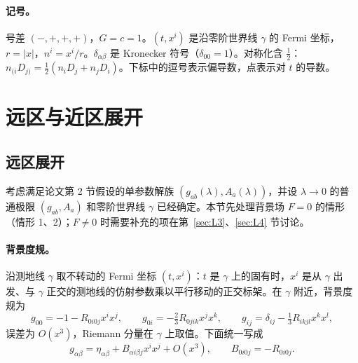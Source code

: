 \documentclass[11pt,a4paper]{ctexart}
\numberwithin{equation}{section}
\begin{document}
\paragraph{记号。}号差 $(-,+,+,+)$，$G=c=1$。$(t,x^i)$ 是沿零阶世界线 $\gamma$ 的 Fermi 坐标，$r=|x|$，$n^i=x^i/r$。$\delta_{\alpha\beta}$ 是 Kronecker 符号（$\delta_{00}=1$）。对称化含 $\tfrac12$：$n_{(i}D_{j)}=\tfrac12(n_iD_j+n_jD_i)$。下标中的逗号表示偏导数，点表示对 $t$ 的导数。

\section{远区与近区展开}
\label{sec:expansions}

\subsection{远区展开}

考虑满足论文第 2 节假设的单参数解族 $(g_{ab}(\lambda),A_a(\lambda))$，并设 $\lambda\to0$ 的普通极限 $(g_{ab},A_a)$ 和零阶世界线 $\gamma$ 已经确定。本节先处理背景场 $F=0$ 的情形（情形 1、2）；$F\neq0$ 时需要补充的项在第~\ref{sec:L3}、\ref{sec:L4} 节讨论。

\paragraph{背景度规。}沿测地线 $\gamma$ 取不转动的 Fermi 坐标 $(t,x^i)$：$t$ 是 $\gamma$ 上的固有时，$x^i$ 是从 $\gamma$ 出发、与 $\gamma$ 正交的测地线的仿射参数乘以平行移动的正交标架。在 $\gamma$ 附近，背景度规为 \citep{ManasseMisner1963}
\begin{equation}
g_{00}=-1-R_{0i0j}x^ix^j,\qquad g_{0i}=-\tfrac23R_{0jik}x^jx^k,\qquad g_{ij}=\delta_{ij}-\tfrac13R_{ikjl}x^kx^l,
\end{equation}
误差为 $O(x^3)$，Riemann 分量在 $\gamma$ 上取值。下面统一写成
\begin{equation}
g_{\alpha\beta}=\eta_{\alpha\beta}+B_{\alpha i\beta j}x^ix^j+O(x^3),\qquad B_{0i0j}=-R_{0i0j}.
\label{eq:fermi}
\end{equation}
\end{document}
